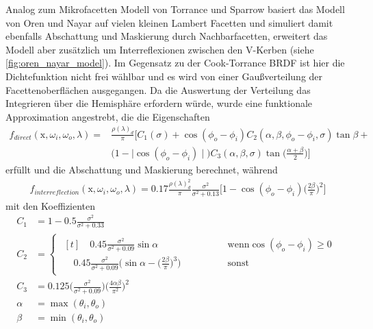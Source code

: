 \documentclass[thesis.tex]{subfiles}
\begin{document}
Analog zum Mikrofacetten Modell von Torrance und Sparrow basiert das Modell von Oren und Nayar auf vielen kleinen Lambert Facetten und simuliert damit ebenfalls Abschattung und Maskierung durch Nachbarfacetten, erweitert das Modell aber zusätzlich um Interreflexionen zwischen den V-Kerben (siehe \autoref{fig:oren_nayar_model}). Im Gegensatz zu der Cook-Torrance BRDF ist hier die Dichtefunktion nicht frei wählbar und es wird von einer Gaußverteilung der Facettenoberflächen ausgegangen. Da die Auswertung der Verteilung das Integrieren über die Hemisphäre erfordern würde, wurde eine funktionale Approximation angestrebt, die die Eigenschaften
\begin{equation}
\begin{aligned}
f_{direct}(\mathrm{x}, \omega_i, \omega_o, \lambda) = &\frac{\rho(\lambda)_d}{\pi}\Big[C_1(\sigma)+\cos(\phi_o - \phi_i)C_2(\alpha,\beta,\phi_o-\phi_i,\sigma)\tan\beta+\\
&\Big(1 - \mid\cos(\phi_o-\phi_i)\mid\Big)C_3(\alpha,\beta,\sigma)\tan\Big(\frac{\alpha+\beta}{2}\Big)\Big]
\end{aligned}
\label{eq:OrenNayar_full_1}
\end{equation}
erfüllt und die Abschattung und Maskierung berechnet, während
\begin{equation}
\begin{aligned}
f_{interreflection}(\mathrm{x}, \omega_i, \omega_o, \lambda) = 0.17\frac{\rho(\lambda)_d^2}{\pi}\frac{\sigma^2}{\sigma^2+0.13}\Big[1-\cos(\phi_o-\phi_i)\Big(\frac{2\beta}{\pi}\Big)^2\Big]
\end{aligned}
\label{eq:OrenNayar_full_2}
\end{equation}
mit den Koeffizienten
\begin{equation}
\begin{align}
C_1 &= 1 - 0.5\frac{\sigma^2}{\sigma^2+0.33}\\[5pt]
C_2 &= 
\begin{cases}
\!\begin{aligned}[t]
\quad0.45\frac{\sigma^2}{\sigma^2+0.09}\sin\alpha \qquad\qquad\qquad\;\, &\text{wenn} \cos(\phi_o-\phi_i)\ge0\\
\quad0.45\frac{\sigma^2}{\sigma^2+0.09}\Big(\sin\alpha-\Big(\frac{2\beta}{\pi}\Big)^3\Big)\quad&\text{sonst}
\end{aligned}
\end{cases}\\[5pt]
C_3 &= 0.125\Big(\frac{\sigma^2}{\sigma^2+0.09}\Big)\Big(\frac{4\alpha\beta}{\pi^2}\Big)^2\\[5pt]
\alpha &= \max(\theta_i, \theta_o)\\[5pt]
\beta &= \min(\theta_i, \theta_o)
\end{align}\tag*{}
\end{equation}
\end{document}
